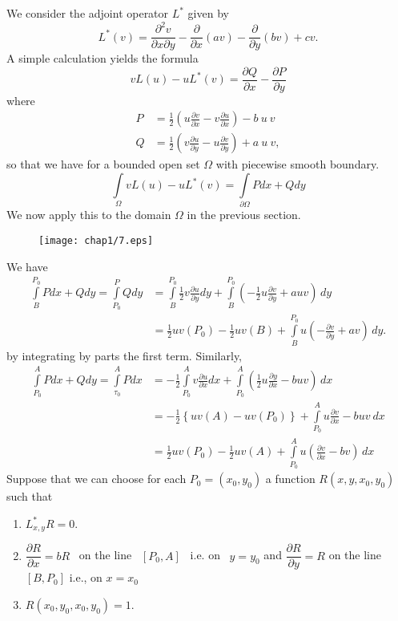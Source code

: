 We consider the adjoint operator $L^{\ast}$ given by
$$
L^{\ast}(v)=\frac{\partial^{2}v}{\partial x\partial y}-\frac{\partial}{\partial x}(av)-\frac{\partial}{\partial y}(bv)+cv.
$$
A simple calculation yields the formula
$$
vL(u)-uL^{\ast}(v)=\frac{\partial Q}{\partial x}-\frac{\partial P}{\partial y}
$$
where
\begin{align*}
P &= \frac{1}{2}\left(u\frac{\partial v}{\partial x}-v\frac{\partial u}{\partial x}\right)-b \ u \ v\\[3pt]
Q &= \frac{1}{2}\left(v\frac{\partial u}{\partial y}-u\frac{\partial v}{\partial y}\right)+a \ u \ v,
\end{align*}
so that we have for a bounded open set $\Omega$ with piecewise smooth boundary.
$$
\int\limits_{\Omega}vL(u)-uL^{\ast}(v)=\int\limits_{\partial \Omega}Pdx+Qdy
$$
We now apply this to the domain $\Omega$ in the previous section.
\begin{figure}[H]
\centering
\texttt{[image: chap1/7.eps]}
\end{figure}

We have
\begin{align*}
\int\limits^{P_{0}}_{B}Pdx+Qdy=\int\limits^{P}_{P_{0}}Qdy &= \int\limits^{P_{0}}_{B}\frac{1}{2}v\frac{\partial u}{\partial y}dy+\int\limits^{P_{0}}_{B}\left(-\frac{1}{2}u\frac{\partial v}{\partial y}+auv\right)\,dy\\[4pt]
&= \frac{1}{2}uv(P_{0})-\frac{1}{2}uv(B)+\int\limits^{P_{0}}_{B}u\left(-\frac{\partial v}{\partial y}+av\right)\,dy.
\end{align*}\pageoriginale
by integrating by parts the first term. Similarly,
\begin{align*}
\int\limits^{A}_{P_{0}}Pdx+Qdy=\int\limits^{A}_{\tau_{0}}Pdx &= -\frac{1}{2}\int\limits^{A}_{P_{0}}v\frac{\partial u}{\partial x}dx+\int\limits^{A}_{P_{0}}\left(\frac{1}{2}u\frac{\partial y}{\partial x}-buv\right)\,dx\\[4pt]
&= -\frac{1}{2}\left\{uv(A)-uv(P_{0})\right\}+\int\limits^{A}_{P_{0}}u\frac{\partial v}{\partial x}-buv \ dx\\[4pt]
&= \frac{1}{2}uv(P_{0})-\frac{1}{2}uv(A)+\int\limits^{A}_{P_{0}}u\left(\frac{\partial v}{\partial x}-bv\right)\,dx
\end{align*}
Suppose that we can choose for each $P_{0}=(x_{0},y_{0})$ a function $R(x,y,x_{0},y_{0})$ such that
\begin{enumerate}
\renewcommand{\labelenumi}{(\theenumi)}
\item $L^{\ast}_{x,y}R=0$.

\item $\dfrac{\partial R}{\partial x}=bR$ \ on the line \ $[P_{0},A]$ \ i.e. on \ $y=y_{0}$ and $\dfrac{\partial R}{\partial y}=R$ on the line $[B, P_{0}]$ i.e., on $x=x_{0}$

\item $R(x_{0},y_{0},x_{0},y_{0})=1$.
\end{enumerate}

